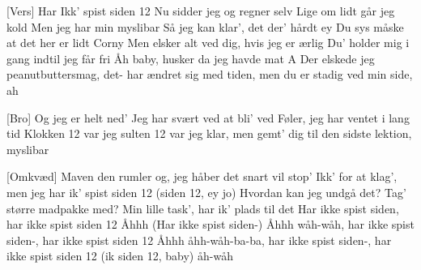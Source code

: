 \documentclass[a4paper,11pt]{article}
\begin{document}
\begin{song}
[Vers] Har Ikk' spist siden 12
Nu sidder jeg og regner selv
Lige om lidt går jeg kold
Men jeg har min myslibar
Så jeg kan klar’, det der’ hårdt ey
Du sys måske at det her er lidt Corny
Men elsker alt ved dig, hvis jeg er ærlig
Du’ holder mig i gang indtil jeg får fri
Åh baby, husker da jeg havde mat A
Der elskede jeg peanutbuttersmag, det-
har ændret sig med tiden, men du er stadig ved min side, ah

[Bro] Og jeg er helt ned’
Jeg har svært ved at bli’ ved
Føler, jeg har ventet i lang tid
Klokken 12 var jeg sulten
12 var jeg klar, men gemt’ dig til den sidste lektion, myslibar

[Omkvæd] Maven den rumler og, jeg håber det snart vil stop’
Ikk' for at klag’, men jeg har ik’ spist siden 12 (siden 12, ey jo)
Hvordan kan jeg undgå det?
Tag’ større madpakke med?
Min lille task’, har ik’ plads til det
Har ikke spist siden, har ikke spist siden 12
Åhhh (Har ikke spist siden-)
Åhhh wåh-wåh, har ikke spist siden-, har ikke spist siden 12
Åhhh åhh-wåh-ba-ba, har ikke spist siden-, har ikke spist siden
12
(ik siden 12, baby) åh-wåh

\end{song}
\end{document}
